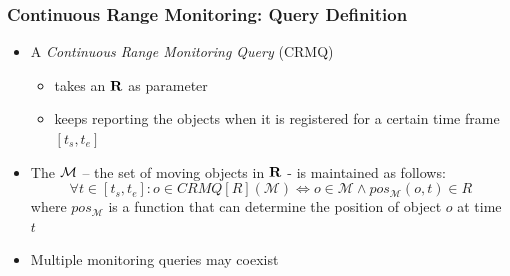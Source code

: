 
\begin{frame}
\frametitle{Continuous Range Monitoring: Query Definition}

\begin{itemize}
  \item A \emph{Continuous Range Monitoring Query} (CRMQ)
    \begin{itemize}
      \item takes an  $\bf R$ as parameter
      \item keeps reporting the objects when it is registered for a certain time frame $[t_s, t_e]$
    \end{itemize}
  \item The  $\bf \mathcal{M}$ -- the set of moving objects in $\bf R$ - is maintained as follows:
    \begin{equation*}
      \forall t \in [t_s, t_e]: o \in CRMQ[R](\mathcal{M})  \Leftrightarrow o \in \mathcal{M} \wedge pos_{\mathcal{M}}(o, t) \in R
    \end{equation*}
    where $pos_\mathcal{M}$ is a function that can determine the position of object $o$ at time $t$
  \item Multiple monitoring queries may coexist
\end{itemize}

\end{frame}


